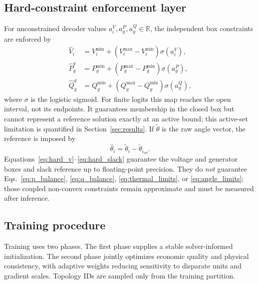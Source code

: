 \documentclass[final,5p,times,twocolumn]{elsarticle}
\newcommand{\R}{\mathbb{R}}
\begin{document}
\subsection{Hard-constraint enforcement layer}
\label{subsec:hard}

For unconstrained decoder values
$a_i^V,a_g^P,a_g^Q\in\R$, the independent box constraints are enforced by
\begin{align}
  \widehat V_i
  &=
  V_i^{\min}
  +(V_i^{\max}-V_i^{\min})\sigma(a_i^V),
  \label{eq:hard_v}\\
  \widehat P_g^g
  &=
  P_g^{\min}
  +(P_g^{\max}-P_g^{\min})\sigma(a_g^P),
  \label{eq:hard_p}\\
  \widehat Q_g^g
  &=
  Q_g^{\min}
  +(Q_g^{\max}-Q_g^{\min})\sigma(a_g^Q),
  \label{eq:hard_q}
\end{align}
where $\sigma$ is the logistic sigmoid. For finite logits this map reaches the
open interval, not its endpoints. It guarantees membership in the closed box
but cannot represent a reference solution exactly at an active bound; this
active-set limitation is quantified in Section~\ref{sec:results}. If
$\widetilde\theta$ is the raw angle vector, the reference is imposed by
\begin{equation}
  \widehat\theta_i
  =
  \widetilde\theta_i
  -\widetilde\theta_{i_{\mathrm{ref}}}.
  \label{eq:hard_slack}
\end{equation}
Equations~\eqref{eq:hard_v}--\eqref{eq:hard_slack} guarantee the voltage and
generator boxes and slack reference up to floating-point precision. They do
\emph{not} guarantee Eqs.~\eqref{eq:p_balance},
\eqref{eq:q_balance}, \eqref{eq:thermal_limits}, or
\eqref{eq:angle_limits}; those coupled non-convex constraints remain
approximate and must be measured after inference.

\subsection{Training procedure}

Training uses two phases. The first phase supplies a stable solver-informed
initialization. The second phase jointly optimizes economic quality and
physical consistency, with adaptive weights reducing sensitivity to disparate
units and gradient scales. Topology IDs are sampled only from the training
partition.
\end{document}
